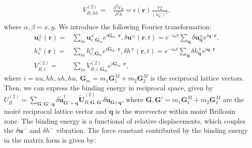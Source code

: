 \documentclass[aps,prx,10pt,twocolumn,superscriptaddress]{revtex4}
\begin{document}
\begin{widetext}
\begin{equation}
\begin{split}
V^{(2)}_{B,hh}=&\frac{\partial^{2} V_{B}}{\partial^{2}h}=\epsilon(\textbf{r})\frac{72}{(h^{-}_{0})^{2}}, \\
\end{split}
\end{equation}
where $\alpha,\beta\!=\!x,y$. We introduce the following Fourier transformation:
\begin{equation}
\begin{split}
\textbf{u}^{\pm}_{c}(\textbf{r})=&\sum_{m}\textbf{u}^{\pm}_{c,\textbf{G}_{m}}e^{i\textbf{G}_{m}\cdot\textbf{r}}, \delta\textbf{u}^{\pm}(\textbf{r},t)=e^{-i\omega t}\sum_{\textbf{q}}\delta\textbf{u}^{\pm}_{\textbf{q}}e^{i\textbf{q}\cdot\textbf{r}},\\
h^{\pm}_{c}(\textbf{r})=&\sum_{m}h^{\pm}_{c,\textbf{G}_{m}}e^{i\textbf{G}_{m}\cdot\textbf{r}}, \delta h^{\pm}(\textbf{r},t)=e^{-i\omega t}\sum_{\textbf{q}}\delta h^{\pm}_{\textbf{q}}e^{i\textbf{q}\cdot\textbf{r}}\\
V^{(2)}_{B,i}=&\sum_{m}V^{(2)}_{B,i,\textbf{G}_{m}}e^{i\textbf{G}_{m}\cdot\textbf{r}},
\end{split}
\end{equation}
where $i\!=\!uu,hh,uh,hu$, $\textbf{G}_{m}\!=\!m_{1}\textbf{G}^{M}_{1}+m_{2}\textbf{G}^{M}_{2}$ is the reciprocal lattice vectors. Then, we can express the binding energy in reciprocal space, given by $U^{(2)}_{B}=\sum_{\textbf{G},\textbf{G}',\textbf{q}}\delta\tilde{\textbf{u}}^{\dagger}_{{\textbf{G}'}+\textbf{q}}\tilde{\textbf{U}}^{(2)}_{B,\textbf{G},\textbf{G}'}\delta\tilde{\textbf{u}}_{\textbf{G}+\textbf{q}}$, where $\textbf{G}, \textbf{G}'\!=\!m_{1}\textbf{G}^{M}_{1}+m_{2}\textbf{G}^{M}_{2}$ are the moir\'e reciprocal lattice vector and $\textbf{q}$ is the wavevector within moir\'e Brillouin zone. The binding energy is a functional of relative displacements, which couples the $\delta\textbf{u}^{-}$ and $\delta h^{-}$ vibration. The force constant contributed by the binding energy in the matrix form is given by:
%

\end{widetext}
\end{document}
